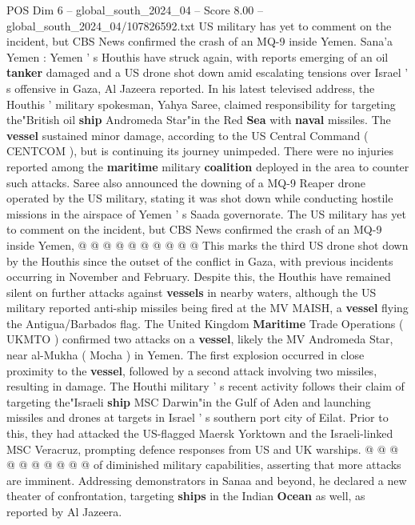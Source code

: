 \begin{textsample}{POS Dim 6 – global\_south\_2024\_04 – Score 8.00 – global\_south\_2024\_04/107826592.txt}  \label{ex:f6_pos_123}
US military has yet to comment on the incident, but CBS News confirmed the crash of an MQ-9 inside Yemen.
Sana'a Yemen : Yemen ' s Houthis have struck again, with reports emerging of an oil \textbf{tanker} damaged and a US drone shot down amid escalating tensions over Israel ' s offensive in Gaza, Al Jazeera reported.
In his latest televised address, the Houthis ' military spokesman, Yahya Saree, claimed responsibility for targeting the"British oil \textbf{ship} Andromeda Star"in the Red \textbf{Sea} with \textbf{naval} missiles.
The \textbf{vessel} sustained minor damage, according to the US Central Command ( CENTCOM ), but is continuing its journey unimpeded.
There were no injuries reported among the \textbf{maritime} military \textbf{coalition} deployed in the area to counter such attacks.
Saree also announced the downing of a MQ-9 Reaper drone operated by the US military, stating it was shot down while conducting hostile missions in the airspace of Yemen ' s Saada governorate.
The US military has yet to comment on the incident, but CBS News confirmed the crash of an MQ-9 inside Yemen, @ @ @ @ @ @ @ @ @ @ This marks the third US drone shot down by the Houthis since the outset of the conflict in Gaza, with previous incidents occurring in November and February.
Despite this, the Houthis have remained silent on further attacks against \textbf{vessels} in nearby waters, although the US military reported anti-ship missiles being fired at the MV MAISH, a \textbf{vessel} flying the Antigua/Barbados flag.
The United Kingdom \textbf{Maritime} Trade Operations ( UKMTO ) confirmed two attacks on a \textbf{vessel}, likely the MV Andromeda Star, near al-Mukha ( Mocha ) in Yemen.
The first explosion occurred in close proximity to the \textbf{vessel}, followed by a second attack involving two missiles, resulting in damage.
The Houthi military ' s recent activity follows their claim of targeting the"Israeli \textbf{ship} MSC Darwin"in the Gulf of Aden and launching missiles and drones at targets in Israel ' s southern port city of Eilat.
Prior to this, they had attacked the US-flagged Maersk Yorktown and the Israeli-linked MSC Veracruz, prompting defence responses from US and UK warships. @ @ @ @ @ @ @ @ @ @ of diminished military capabilities, asserting that more attacks are imminent.
Addressing demonstrators in Sanaa and beyond, he declared a new theater of confrontation, targeting \textbf{ships} in the Indian \textbf{Ocean} as well, as reported by Al Jazeera.

\end{textsample}
